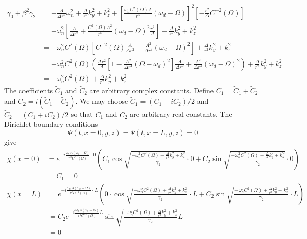 \documentclass[english]{article}
\begin{document}
\begin{align*}
\gamma_{0}+\beta^{2}\gamma_{2} & =-\frac{A}{\Delta r^{2}}\omega^{2}_{n}+\frac{\Delta}{r^{2}}k^{2}_{y}+k^{2}_{z}+\left[\frac{\omega_{n}C^{2}\left(\Omega\right)A}{r^{3}}\left(\omega_{d}-\Omega\right)\right]^{2}\left[-\frac{r^{2}}{\Delta}C^{-2}\left(\Omega\right)\right]\\
 & =-\omega^{2}_{n}\left[\frac{A}{\Delta r^{2}}+\frac{C^{2}\left(\Omega\right)A^{2}}{r^{6}}\left(\omega_{d}-\Omega\right)^{2}\frac{r^{2}}{\Delta}\right]+\frac{\Delta}{r^{2}}k^{2}_{y}+k^{2}_{z}\\
 & =-\omega^{2}_{n}C^{2}\left(\Omega\right)\left[C^{-2}\left(\Omega\right)\frac{A}{\Delta r^{2}}+\frac{A^{2}}{\Delta r^{4}}\left(\omega_{d}-\Omega\right)^{2}\right]+\frac{\Delta}{r^{2}}k^{2}_{y}+k^{2}_{z}\\
 & =-\omega^{2}_{n}C^{2}\left(\Omega\right)\left(\frac{\Delta r^{2}}{A}\left[1-\frac{A^{2}}{\Delta r^{4}}\left(\Omega-\omega_{d}\right)^{2}\right]\frac{A}{\Delta r^{2}}+\frac{A^{2}}{\Delta r^{4}}\left(\omega_{d}-\Omega\right)^{2}\right)+\frac{\Delta}{r^{2}}k^{2}_{y}+k^{2}_{z}\\
 & =-\omega^{2}_{n}C^{2}\left(\Omega\right)+\frac{\Delta}{r^{2}}k^{2}_{y}+k^{2}_{z}
\end{align*}
 The coefficients $\tilde{C}_{1}$ and $\tilde{C}_{2}$ are arbitrary
complex constants. Define $C_{1}=\tilde{C}_{1}+\tilde{C}_{2}$ and
$C_{2}=i\left(\tilde{C}_{1}-\tilde{C}_{2}\right)$. We may choose
$\tilde{C}_{1}=\left(C_{1}-iC_{2}\right)/2$ and $\tilde{C}_{2}=\left(C_{1}+iC_{2}\right)/2$
so that $C_{1}$ and $C_{2}$ are arbitrary real constants. The Dirichlet
boundary conditions 
\[
\Psi\left(t,x=0,y,z\right)=\Psi\left(t,x=L,y,z\right)=0
\]
 give 
\begin{align*}
\chi\left(x=0\right) & =e^{-i\frac{\omega_{n}A\left(\omega_{d}-\Omega\right)}{r^{3}C^{-2}\left(\Omega\right)}\cdot0}\left(C_{1}\cos\sqrt{\frac{-\omega^{2}_{n}C^{2}\left(\Omega\right)+\frac{\Delta}{r^{2}}k^{2}_{y}+k^{2}_{z}}{\gamma_{2}}}\cdot0+C_{2}\sin\sqrt{\frac{-\omega^{2}_{n}C^{2}\left(\Omega\right)+\frac{\Delta}{r^{2}}k^{2}_{y}+k^{2}_{z}}{\gamma_{2}}}\cdot0\right)\\
 & =C_{1}=0
\end{align*}
 {}
\begin{align*}
\chi\left(x=L\right) & =e^{-i\frac{\omega_{n}A\left(\omega_{d}-\Omega\right)}{r^{3}C^{-2}\left(\Omega\right)}\cdot L}\left(0\cdot\cos\sqrt{\frac{-\omega^{2}_{n}C^{2}\left(\Omega\right)+\frac{\Delta}{r^{2}}k^{2}_{y}+k^{2}_{z}}{\gamma_{2}}}\cdot L+C_{2}\sin\sqrt{\frac{-\omega^{2}_{n}C^{2}\left(\Omega\right)+\frac{\Delta}{r^{2}}k^{2}_{y}+k^{2}_{z}}{\gamma_{2}}}\cdot L\right)\\
 & =C_{2}e^{-i\frac{\omega_{n}A\left(\omega_{d}-\Omega\right)}{r^{3}C^{-2}\left(\Omega\right)}L}\sin\sqrt{\frac{-\omega^{2}_{n}C^{2}\left(\Omega\right)+\frac{\Delta}{r^{2}}k^{2}_{y}+k^{2}_{z}}{\gamma_{2}}}L\\
 & =0
\end{align*}
\end{document}

